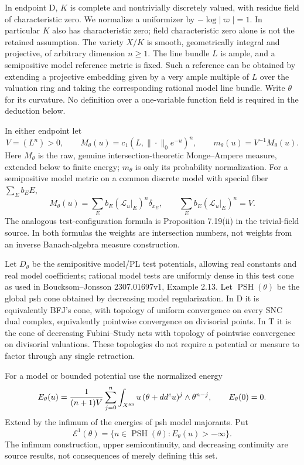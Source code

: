 \documentclass[11pt]{article}
\begin{document}
In endpoint D, \(K\) is complete and nontrivially discretely valued, with residue field of characteristic zero. We normalize a uniformizer by \(-\log|\varpi|=1\). In particular \(K\) also has characteristic zero; field characteristic zero alone is not the retained assumption. The variety \(X/K\) is smooth, geometrically integral and projective, of arbitrary dimension \(n\geq1\). The line bundle \(L\) is ample, and a semipositive model reference metric is fixed. Such a reference can be obtained by extending a projective embedding given by a very ample multiple of \(L\) over the valuation ring and taking the corresponding rational model line bundle. Write \(\theta\) for its curvature. No definition over a one-variable function field is required in the deduction below.

In either endpoint let
\[
 V=(L^n)>0,\qquad M_\theta(u)=c_1(L,\|\cdot\|_0e^{-u})^n,
 \qquad m_\theta(u)=V^{-1}M_\theta(u).
\]
Here \(M_\theta\) is the raw, genuine intersection-theoretic Monge--Ampere measure, extended below to finite energy; \(m_\theta\) is only its probability normalization. For a semipositive model metric on a common discrete model with special fiber \(\sum_E b_EE\),
\[
 M_\theta(u)=\sum_E b_E(\mathcal L_u|_E)^n\delta_{x_E},
 \qquad \sum_E b_E(\mathcal L_u|_E)^n=V.
\]
The analogous test-configuration formula is Proposition 7.19(ii) in the trivial-field source. In both formulas the weights are intersection numbers, not weights from an inverse Banach-algebra measure construction.

Let \(D_\theta\) be the semipositive model/PL test potentials, allowing real constants and real model coefficients; rational model tests are uniformly dense in this test cone as used in Boucksom--Jonsson 2307.01697v1, Example 2.13. Let \(\operatorname{PSH}(\theta)\) be the global psh cone obtained by decreasing model regularization. In D it is equivalently BFJ's cone, with topology of uniform convergence on every SNC dual complex, equivalently pointwise convergence on divisorial points. In T it is the cone of decreasing Fubini--Study nets with topology of pointwise convergence on divisorial valuations. These topologies do not require a potential or measure to factor through any single retraction.

For a model or bounded potential use the normalized energy
\[
 E_\theta(u)=\frac1{(n+1)V}\sum_{j=0}^n
 \int_{X^{\rm an}}u\,(\theta+dd^cu)^j\wedge\theta^{n-j},
 \qquad E_\theta(0)=0.
\]
Extend by the infimum of the energies of psh model majorants. Put
\[
 \mathcal E^1(\theta)=\{u\in\operatorname{PSH}(\theta):E_\theta(u)>-\infty\}.
\]
The infimum construction, upper semicontinuity, and decreasing continuity are source results, not consequences of merely defining this set.
\end{document}
